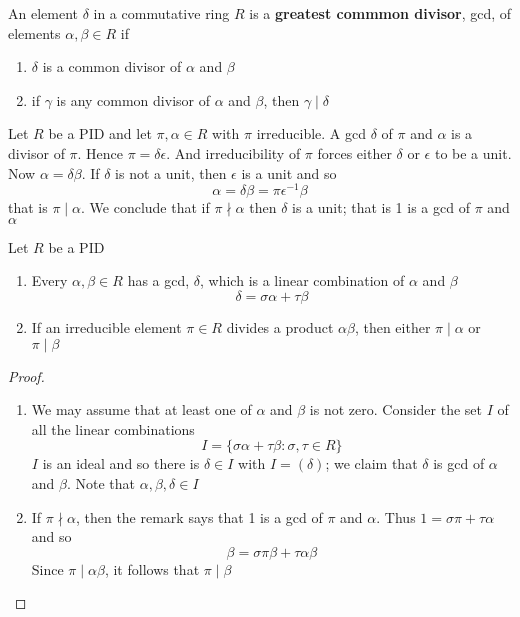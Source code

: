 \documentclass[11pt]{article}
\begin{document}
\begin{definition}[]
An element \(\delta\) in a commutative ring \(R\) is a \textbf{greatest commmon divisor}, gcd, of
elements \(\alpha,\beta \in R\) if
\begin{enumerate}
\item \(\delta\) is a common divisor of \(\alpha\) and \(\beta\)
\item if \(\gamma\) is any common divisor of \(\alpha\) and \(\beta\), then \(\gamma\mid\delta\)
\end{enumerate}
\end{definition}

\begin{remark}
Let \(R\) be a PID and let \(\pi,\alpha\in R\) with \(\pi\) irreducible. A gcd \(\delta\) of
\(\pi\) and \(\alpha\) is a divisor of \(\pi\). Hence \(\pi=\delta\epsilon\). And
irreducibility of \(\pi\) forces either \(\delta\) or \(\epsilon\) to be a unit. Now
\(\alpha=\delta\beta\). If \(\delta\) is not a unit, then \(\epsilon\) is a unit and so 
\begin{equation*}
\alpha=\delta\beta=\pi\epsilon^{-1}\beta
\end{equation*}
that is \(\pi\mid\alpha\). We conclude that if \(\pi\nmid\alpha\) then \(\delta\) is a
unit; that is 1 is a gcd of \(\pi\) and \(\alpha\)
\end{remark}

\begin{theorem}[]
\label{thm3.57}
Let \(R\) be a PID
\begin{enumerate}
\item Every \(\alpha,\beta\in R\) has a gcd, \(\delta\), which is a linear combination of
\(\alpha\) and \(\beta\)
\begin{equation*}
\delta=\sigma\alpha+\tau\beta
\end{equation*}
\item If an irreducible element \(\pi\in R\) divides a product \(\alpha\beta\), then
either \(\pi\mid\alpha\) or \(\pi\mid\beta\)
\end{enumerate}
\end{theorem}
\begin{proof}
\begin{enumerate}
\item We may assume that at least one of \(\alpha\) and \(\beta\) is not zero. Consider the set \(I\)
of all the linear combinations
\begin{equation*}
I=\{\sigma\alpha+\tau\beta:\sigma,\tau\in R\}
\end{equation*}
\(I\) is an ideal and so there is \(\delta\in I\) with \(I=(\delta)\); we claim
that \(\delta\) is gcd of \(\alpha\) and \(\beta\). Note that \(\alpha,\beta,\delta \in I\)
\item If \(\pi\nmid\alpha\), then the remark says that 1 is a gcd of \(\pi\) and \(\alpha\).
Thus \(1=\sigma\pi+\tau\alpha\) and so
\begin{equation*}
\beta=\sigma\pi\beta+\tau\alpha\beta
\end{equation*}
Since \(\pi\mid\alpha\beta\), it follows that \(\pi\mid\beta\)
\end{enumerate}
\end{proof}
\end{document}
